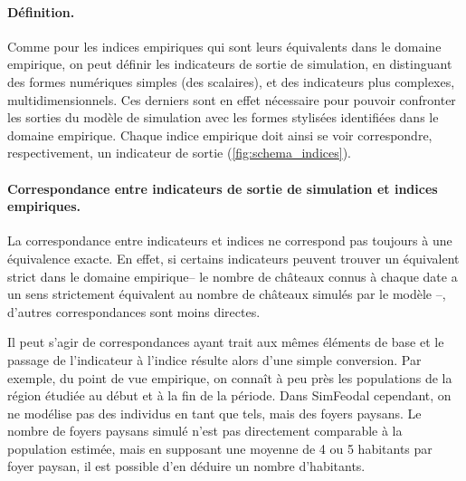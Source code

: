 \paragraph{Définition.}
Comme pour les indices empiriques qui sont leurs équivalents dans le domaine empirique, on peut définir les indicateurs de sortie de simulation, en distinguant des formes numériques simples (des scalaires), et des indicateurs plus complexes, multidimensionnels.
Ces derniers sont en effet nécessaire pour pouvoir confronter les sorties du modèle de simulation avec les formes stylisées identifiées dans le domaine empirique.
Chaque indice empirique doit ainsi se voir correspondre, respectivement, un indicateur de sortie (\cref{fig:schema_indices}).

\paragraph{Correspondance entre indicateurs de sortie de simulation et indices empiriques.}\label{par:correspondance}

La correspondance entre indicateurs et indices ne correspond pas toujours à une équivalence exacte.
En effet, si certains indicateurs peuvent trouver un équivalent strict dans le domaine empirique-- le nombre de châteaux connus à chaque date a un sens strictement équivalent au nombre de châteaux simulés par le modèle --, d'autres correspondances sont moins directes.

Il peut s'agir de correspondances ayant trait aux mêmes éléments de base et le passage de l'indicateur à l'indice résulte alors d'une simple conversion.
Par exemple, du point de vue empirique, on connaît à peu près les populations de la région étudiée au début et à la fin de la période.
Dans SimFeodal cependant, on ne modélise pas des individus en tant que tels, mais des foyers paysans.
Le nombre de foyers paysans simulé n'est pas directement comparable à la population estimée, mais en supposant une moyenne de 4 ou 5 habitants par foyer paysan, il est possible d'en déduire un nombre d'habitants.

